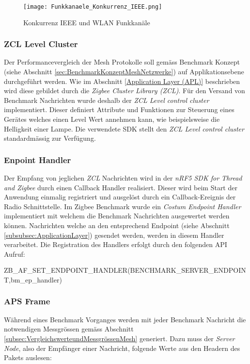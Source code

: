 \begin{figure}[h]
	\centering
	\texttt{[image: Funkkanaele\_Konkurrenz\_IEEE.png]}
	\caption{Konkurrenz IEEE und WLAN Funkkanäle \cite{markus_krause_rainer_konrad_drahtlose_2014}}
	\label{fig:KonkurrenzIEEEundWLANFunkkanäle}
\end{figure}

\subsubsection{ZCL Level Cluster}\label{subsubsec:ZCLLevelCluster}
Der Performancevergleich der Mesh Protokolle soll gemäss Benchmark Konzept (siehe Abschnitt \ref{sec:BenchmarkKonzeptMeshNetzwerke}) auf Applikationsebene durchgeführt werden.
Wie im Abschnitt \ref{Application Layer (APL)} beschrieben wird diese gebildet durch die \textit{Zigbee Cluster Library (ZCL)}.
Für den Versand von Benchmark Nachrichten wurde deshalb der \textit{ZCL Level control cluster} implementiert.
Dieser definiert Attribute und Funktionen zur Steuerung eines Gerätes welches einen Level Wert annehmen kann, wie beispielsweise die Helligkeit einer Lampe.
Die verwendete SDK stellt den \textit{ZCL Level control cluster} standardmässig zur Verfügung.\cite{the_zigbee_alliance_zigbee_2016}


\subsubsection{Enpoint Handler}\label{subsubsec:EnpointHandler}
Der Empfang von jeglichen \textit{ZCL} Nachrichten wird in der \textit{nRF5 SDK for Thread and Zigbee} durch einen Callback Handler realisiert.
Dieser wird beim Start der Anwendung einmalig registriert und ausgelöst durch ein Callback-Ereignis der Radio Schnittstelle.
Im Zigbee Benchmark wurde ein \textit{Costum Endpoint Handler} implementiert mit welchem die Benchmark Nachrichten ausgewertet werden können.
Nachrichten welche an den entsprechend Endpoint (siehe Abschnitt \ref{subsubsec:ApplicationLayer}) gesendet werden, werden in diesem Handler verarbeitet.
Die Registration des Handlers erfolgt durch den folgenden API Aufruf:

ZB\_AF\_SET\_ENDPOINT\_HANDLER(BENCHMARK\_SERVER\_ENDPOINT,\linebreak bm\_ep\_handler)

\subsubsection{APS Frame}\label{subsubsec:ZigbeeAPSFrame}
Während eines Benchmark Vorganges werden mit jeder Benchmark Nachricht die notwendigen Messgrössen gemäss Abschnitt \ref{subsec:VergleichswerteundMessgrössenMesh} generiert.
Dazu muss der \textit{Server Node}, also der Empfänger einer Nachricht, folgende Werte aus den Headern des Pakets auslesen:

